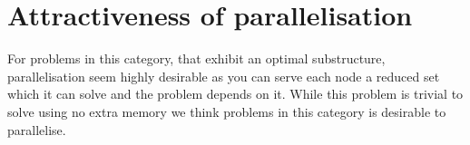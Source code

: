 \section{Attractiveness of parallelisation}
For problems in this category, that exhibit an optimal substructure, parallelisation seem highly desirable as you can serve each node a reduced set which it can solve and the problem depends on it. While this problem is trivial to solve using no extra memory we think problems in this category is desirable to parallelise. 